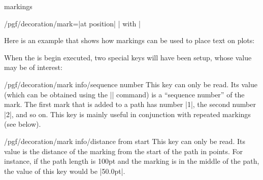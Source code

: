 \begin{decoration}{markings}
\begin{key}{/pgf/decoration/mark=|at position|
      | with |}
\begin{codeexample}[]
\end{codeexample}

    Here is an example that shows how markings can be used to place text
    on plots:
\begin{codeexample}[]
\end{codeexample}

    When the  is begin executed, two special keys will have
    been setup, whose value may be of interest:
    \begin{key}{/pgf/decoration/mark info/sequence number}
      This key can only be read. Its value (which can be obtained
      using the |\pgfkeysvalueof| command) is a ``sequence number'' of
      the mark. The first mark that is added to a path has number |1|,
      the second number |2|, and so on. This key is mainly useful in
      conjunction with repeated markings (see below).
    \end{key}
    \begin{key}{/pgf/decoration/mark info/distance from start}
      This key can only be read. Its value is the distance of the
      marking from the start of the path in points. For instance, if
      the path length is 100pt and the marking is in the middle of the
      path, the value of this key would be |50.0pt|.
    \end{key}
  \end{key}


\end{decoration}
